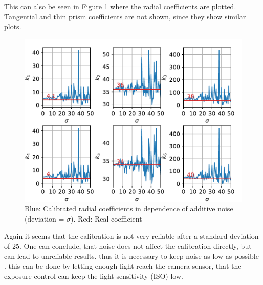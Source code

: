 This can also be seen in Figure \ref{development:noise_k} where the radial coefficients are plotted.
Tangential and thin prism coefficients are not shown, since they show similar plots.
\begin{figure}
	\centering
	\includegraphics[width=0.9\linewidth]{3-development/calibration/images/noise_k.pdf}
	\caption{Blue: Calibrated radial coefficients in dependence of additive noise (deviation = $\sigma$). Red: Real coefficient\label{development:noise_k}}
\end{figure}
Again it seems that the calibration is not very reliable after a standard deviation of 25.
One can conclude, that noise does not affect the calibration directly, but can lead to unreliable results.
thus it is necessary to keep noise as low as possible .
this can be done by letting enough light reach the camera sensor, that the exposure control can keep the light sensitivity (ISO) low.

